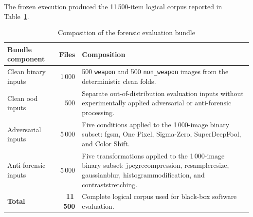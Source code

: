 The frozen execution produced the 11\,500-item logical corpus reported in
Table~\ref{tab:implementation-forensic-bundle-composition}.

\begin{table}[H]
\centering
\small
\renewcommand{\arraystretch}{1.15}
\setlength{\tabcolsep}{5pt}
\caption{Composition of the forensic evaluation bundle}
\label{tab:implementation-forensic-bundle-composition}
\begin{tabularx}{0.94\textwidth}{@{}l r X@{}}
\toprule
\textbf{Bundle component} &
\textbf{Files} &
\textbf{Composition} \\
\midrule

Clean binary inputs
&
1\,000
&
500 \texttt{weapon} and 500 \texttt{non\_weapon} images from the
deterministic clean folds. \\

Clean \gls{ood} inputs
&
500
&
Separate out-of-distribution evaluation inputs without experimentally applied
adversarial or anti-forensic processing. \\

Adversarial inputs
&
5\,000
&
Five conditions applied to the 1\,000-image binary subset: \gls{fgsm},
One Pixel, Sigma-Zero, SuperDeepFool, and Color Shift. \\

Anti-forensic inputs
&
5\,000
&
Five transformations applied to the 1\,000-image binary subset:
\gls{jpegrecompression}, \gls{resampleresize}, \gls{gaussianblur},
\gls{histogrammodification}, and \gls{contraststretching}. \\

\midrule
\textbf{Total}
&
\textbf{11\,500}
&
Complete logical corpus used for black-box software evaluation. \\

\bottomrule
\end{tabularx}
\end{table}

